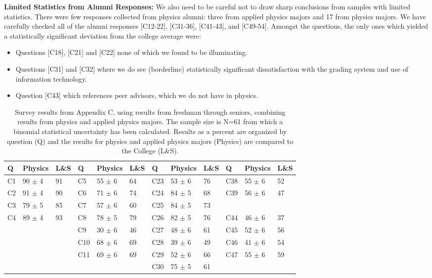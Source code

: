 \documentclass[12pt]{article}
\begin{document}
\noindent
{\bf Limited Statistics from Alumni Responses:} We also need to be
careful not to draw sharp conclusions from samples with limited
statistics.  There were few responses collected from physics alumni:
three from applied physics majors and 17 from physics majors.  We have
carefully checked all of the alumni responses [C12-22], [C31-36],
[C41-43], and [C49-54].  Amongst the questions, the only ones which
yielded a statistically significant deviation from the college average
were:
\begin{itemize}
  \item Questions [C18], [C21] and [C22] none of which we found to be
    illuminating.
  \item Questions [C31] and [C32] where we do see (borderline)
    statistically significant dissatisfaction with the grading system
    and use of information technology.
  \item Question [C43] which references peer advisors, which we do not
    have in physics.
\end{itemize}

\begin{table}[htbp]
\caption{\label{tbl:appc} Survey results from Appendix C, using
  results from freshman through seniors, combining results from
  physics and applied physics majors. The sample size is N=61 from
  which a binomial statistical uncertainty has been calculated.
  Results as a percent are organized by question (Q) and the results
  for physics and applied physics majors (Physics) are compared to the
  College (L\&S).}
\begin{center}
\begin{tabular}{|lll|lll|lll|lll|}
\hline
Q & Physics & L\&S & Q & Physics & L\&S & Q & Physics & L\&S & Q & Physics & L\&S \\
\hline
C1 & 90 $\pm$ 4 & 91 & C5  & 55 $\pm$ 6 & 64 & C23 & 53 $\pm$ 6 & 76 & C38 & 55 $\pm$ 6 & 52 \\
C2 & 91 $\pm$ 4 & 90 & C6  & 71 $\pm$ 6 & 74 & C24 & 84 $\pm$ 5 & 68 & C39 & 56 $\pm$ 6 & 47 \\
C3 & 79 $\pm$ 5 & 85 & C7  & 57 $\pm$ 6 & 60 & C25 & 84 $\pm$ 5 & 73 &     &            &    \\                  
C4 & 89 $\pm$ 4 & 93 & C8  & 78 $\pm$ 5 & 79 & C26 & 82 $\pm$ 5 & 76 & C44 & 46 $\pm$ 6 & 37 \\
~  &            &    & C9  & 30 $\pm$ 6 & 46 & C27 & 48 $\pm$ 6 & 61 & C45 & 52 $\pm$ 6 & 56 \\
~  &            &    & C10 & 68 $\pm$ 6 & 69 & C28 & 39 $\pm$ 6 & 49 & C46 & 41 $\pm$ 6 & 54 \\
~  &            &    & C11 & 69 $\pm$ 6 & 69 & C29 & 52 $\pm$ 6 & 66 & C47 & 55 $\pm$ 6 & 59 \\
~  &            &    &     &            &    & C30 & 75 $\pm$ 5 & 61 &     &            &    \\
\hline 
\end{tabular}
\end{center}
\end{table}
\end{document}
